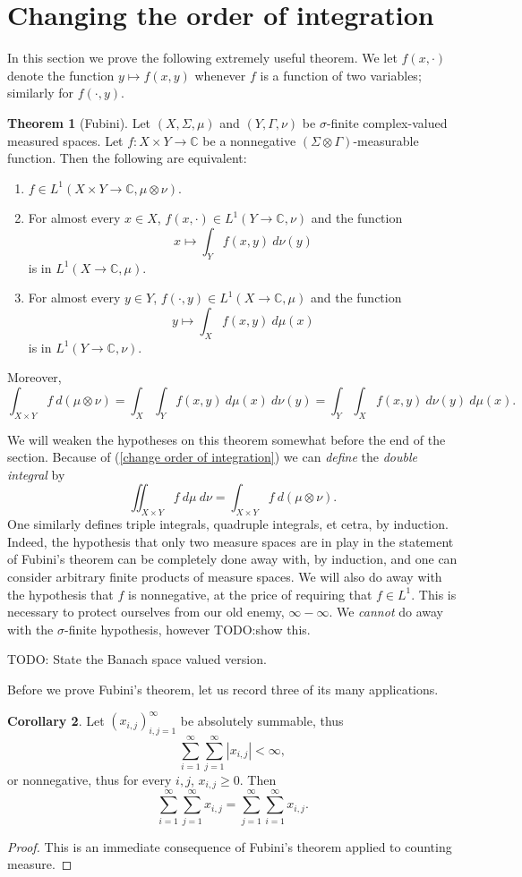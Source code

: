 \documentclass[12pt]{book}
\newcommand{\CC}{\mathbb{C}}
\newcommand{\dfn}[1]{\emph{#1}\index{#1}}
\theoremstyle{definition}
\newtheorem{theorem}{Theorem}[section]
\newtheorem{corollary}[theorem]{Corollary}
\begin{document}
\section{Changing the order of integration}
In this section we prove the following extremely useful theorem.
We let $f(x, \cdot)$ denote the function $y \mapsto f(x, y)$ whenever $f$ is a function of two variables; similarly for $f(\cdot, y)$.
\begin{theorem}[Fubini]
Let $(X, \Sigma, \mu)$ and $(Y, \Gamma, \nu)$ be $\sigma$-finite complex-valued measured spaces.
Let $f: X \times Y \to \CC$ be a nonnegative $(\Sigma \otimes \Gamma)$-measurable function.
Then the following are equivalent:
\begin{enumerate}
\item $f \in L^1(X \times Y \to \CC, \mu \otimes \nu)$.
\item For almost every $x \in X$, $f(x, \cdot) \in L^1(Y \to \CC, \nu)$ and the function
$$x \mapsto \int_Y f(x, y)~d\nu(y)$$
is in $L^1(X \to \CC, \mu)$.
\item For almost every $y \in Y$, $f(\cdot, y) \in L^1(X \to \CC, \mu)$ and the function
$$y \mapsto \int_X f(x, y)~d\mu(x)$$
is in $L^1(Y \to \CC, \nu)$.
\end{enumerate}
Moreover,
\begin{equation}
\label{change order of integration}
\int_{X \times Y} f~d(\mu \otimes \nu) = \int_X \int_Y f(x, y) ~d\mu(x)~d\nu(y) = \int_Y \int_X f(x, y) ~d\nu(y) ~d\mu(x).
\end{equation}
\end{theorem}
We will weaken the hypotheses on this theorem somewhat before the end of the section.
Because of (\ref{change order of integration}) we can \emph{define} the \dfn{double integral} by
$$\iint_{X \times Y} f ~d\mu ~d\nu = \int_{X \times Y} f~d(\mu \otimes \nu).$$
One similarly defines triple integrals, quadruple integrals, et cetra, by induction.
Indeed, the hypothesis that only two measure spaces are in play in the statement of Fubini's theorem can be completely done away with, by induction, and one can consider arbitrary finite products of measure spaces.
We will also do away with the hypothesis that $f$ is nonnegative, at the price of requiring that $f \in L^1$.
This is necessary to protect ourselves from our old enemy, $\infty - \infty$.
We \emph{cannot} do away with the $\sigma$-finite hypothesis, however TODO:show this.

TODO: State the Banach space valued version.

Before we prove Fubini's theorem, let us record three of its many applications.
\begin{corollary}
Let $(x_{i,j})_{i,j=1}^\infty$ be absolutely summable, thus
$$\sum_{i=1}^\infty \sum_{j=1}^\infty |x_{i,j}| < \infty,$$
or nonnegative, thus for every $i,j$, $x_{i,j} \geq 0$. Then
$$\sum_{i=1}^\infty \sum_{j=1}^\infty x_{i,j} = \sum_{j=1}^\infty \sum_{i=1}^\infty x_{i,j}.$$
\end{corollary}
\begin{proof}
This is an immediate consequence of Fubini's theorem applied to counting measure.
\end{proof}
\end{document}
